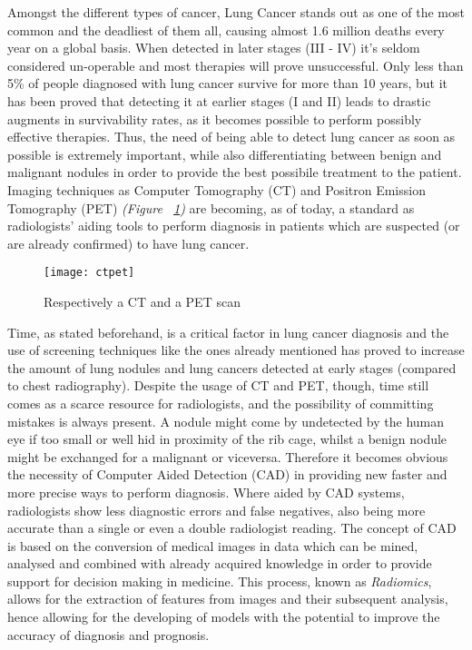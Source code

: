 \documentclass[../main.tex]{subfiles}
\begin{document}
\label{stateofart}
\thispagestyle{empty}


Amongst the different types of cancer, Lung Cancer stands out as one of the most common and the deadliest of them all, causing almost 1.6 million deaths every year on a global basis.\cite{Wasserman2015} When detected in later stages (III - IV) it's seldom considered un-operable and most therapies will prove unsuccessful. Only less than 5\% of people diagnosed with lung cancer survive for more than 10 years, but it has been proved that detecting it at earlier stages (I and II) leads to drastic augments in survivability rates,\cite{CancerResearchUK} as it becomes possible to perform possibly effective therapies. Thus, the need of being able to detect lung cancer as soon as possible is extremely important, while also differentiating between benign and malignant nodules in order to provide the best possibile treatment to the patient. Imaging techniques as Computer Tomography (CT) and Positron Emission Tomography (PET) \textit{(Figure ~\ref{ctpet})} are becoming, as of today, a standard as radiologists' aiding tools to perform diagnosis in patients which are suspected (or are already confirmed) to have lung cancer.\cite{Indicators2017} 

\begin{figure}[!b]
\centering
\texttt{[image: ctpet]}
\caption{Respectively a CT and a PET scan}
\label{ctpet}
\end{figure}

Time, as stated beforehand, is a critical factor in lung cancer diagnosis and the use of screening techniques like the ones already mentioned has proved to increase the amount of lung nodules and lung cancers detected at early stages (compared to chest radiography).\cite{AlMohammad2017} Despite the usage of CT and PET, though, time still comes as a scarce resource for radiologists, and the possibility of committing mistakes is always present. A nodule might come by undetected by the human eye if too small or well hid in proximity of the rib cage, whilst a benign nodule might be exchanged for a malignant or viceversa. Therefore it becomes obvious the necessity of Computer Aided Detection (CAD) in providing new faster and more precise ways to perform diagnosis. Where aided by CAD systems, radiologists show less diagnostic errors and false negatives, also being more accurate than a single or even a double radiologist reading.\cite{AlMohammad2017} The concept of CAD is based on the conversion of medical images in data which can be mined, analysed and combined with already acquired knowledge in order to provide support for decision making in medicine. This process, known as \textit{Radiomics}, allows for the extraction of features from images and their subsequent analysis, hence allowing for the developing of models with the potential to improve the accuracy of diagnosis and prognosis.\cite{Gillies2016} 
\vspace{5mm}
\end{document}
